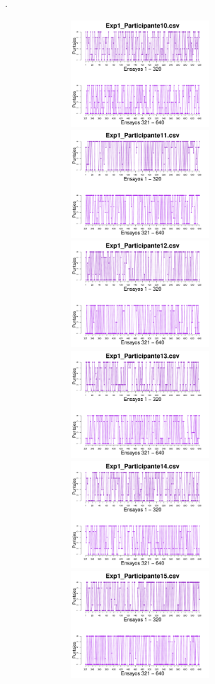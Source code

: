 \documentclass[a4paper ]{article}
\begin{document}
\vfill .
\begin{figure}[th]
\begin{center}
\includegraphics[width=8cm, height=4cm]{Figures/Rating_Exp1_P10} \includegraphics[width=8cm, height=4cm]{Figures/Rating_Exp1_P11} \includegraphics[width=8cm, height=4cm]{Figures/Rating_Exp1_P12}
\includegraphics[width=8cm, height=4cm]{Figures/Rating_Exp1_P13} \includegraphics[width=8cm, height=4cm]{Figures/Rating_Exp1_P14} \includegraphics[width=8cm, height=4cm]{Figures/Rating_Exp1_P15}

\end{center}
\end{figure}
\end{document}
